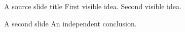 \documentclass[aspectratio=169]{beamer}
\begin{document}
\begin{frame}{A source slide title}
First visible idea.
\pause
Second visible idea.
\end{frame}
\begin{frame}{A second slide}
An independent conclusion.
\end{frame}
\end{document}
